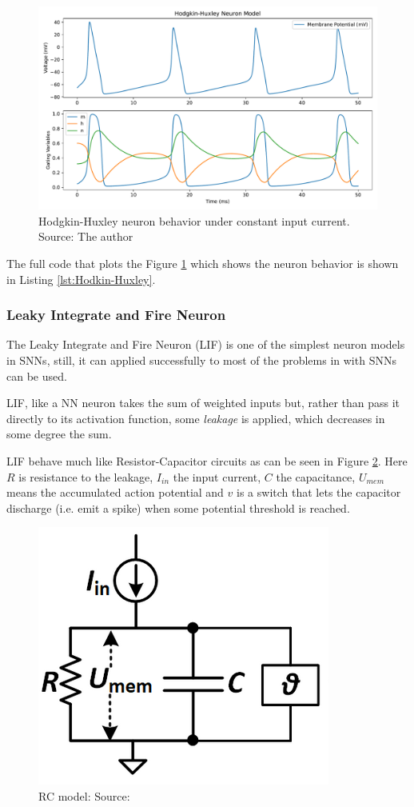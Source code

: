 			\begin{figure}[H]
				\centering
				\includegraphics[width=0.7\linewidth]{images/hodkinHuxleyNeuronBehavior}
				\caption[Hodgkin-Huxley neuron behavior]{Hodgkin-Huxley neuron behavior under constant input current. Source: The author}
				\label{fig:hodkinhuxleyneuronbehavior}
			\end{figure}
			
			\par The full code that plots the Figure \ref{fig:hodkinhuxleyneuronbehavior} which shows the neuron behavior is shown in Listing \ref{lst:Hodkin-Huxley}.
			
			

		\subsubsection{Leaky Integrate and Fire Neuron}
			\par The Leaky Integrate and Fire Neuron (LIF) is one of the simplest neuron models in SNNs, still, it can applied successfully to most of the problems in with SNNs can be used.
			\begin{multicols}{2}
				\par LIF, like a NN neuron takes the sum of weighted inputs but, rather than pass it directly to its activation function, some \textit{leakage} is applied, which decreases in some degree the sum. 
				\par LIF behave much like Resistor-Capacitor circuits as can be seen in Figure \ref{fig:rcmodel}. Here $R$ is resistance to the leakage, $I_{in}$ the input current, $C$ the capacitance, $U_{mem}$ means the accumulated action potential and $v$ is a switch that lets the capacitor discharge (i.e. emit a spike) when some potential threshold is reached.
			\columnbreak
				\begin{figure}[H]
					\centering
					\includegraphics[width=0.5\linewidth]{images/rcmodel}
					\caption[The RC model]{RC model: Source: \cite{10242251}}
					\label{fig:rcmodel}
				\end{figure}
			\end{multicols}
			
